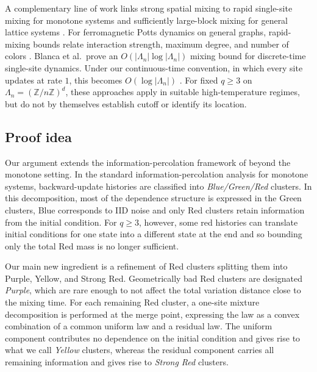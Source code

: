 \documentclass[letterpaper,11pt,reqno]{amsart}
\theoremstyle{definition}
\begin{document}
A complementary line of work links strong spatial mixing to rapid single-site mixing for monotone systems and sufficiently large-block mixing for general lattice systems \cite{RapidMixLattice}.
For ferromagnetic Potts dynamics on general graphs, rapid-mixing bounds relate interaction strength, maximum degree, and number of colors \cite{GeneralPotts}.
Blanca et al.\ prove an \(O(|\Lambda_n|\log|\Lambda_n|)\) mixing bound
for discrete-time single-site dynamics. Under our continuous-time convention, in which every site updates at rate \(1\), this becomes
\(O(\log|\Lambda_n|)\) \cite{Spectral}.
For fixed \(q\ge3\) on \(\Lambda_n=(\mathbb Z/n\mathbb Z)^d\), these approaches apply in suitable high-temperature regimes, but do not by themselves establish cutoff or identify its location.








\subsection{Proof idea}

Our argument extends the information-percolation framework of \cite{Exposition,Universality} beyond the monotone setting. In the standard information-percolation analysis for monotone systems, backward-update histories are classified into \emph{Blue/Green/Red} clusters. In this decomposition, most of the dependence structure is expressed in the Green clusters, Blue corresponds to IID noise and only Red clusters retain information from the initial condition. For \(q\ge3\), however, some red histories can translate initial conditions for one state into a different state at the end and so bounding only the total Red mass is no longer sufficient.

Our main new ingredient is a refinement of Red clusters splitting them into Purple, Yellow, and Strong Red.
Geometrically bad Red clusters are designated \emph{Purple}, which are rare enough to not affect the total variation distance close to the mixing time. For each remaining Red cluster, a one-site mixture decomposition is performed at the merge point, expressing the law as a convex combination of a common uniform law and a residual law. The uniform component contributes no dependence on the initial condition and gives rise to what we call \emph{Yellow} clusters, whereas the residual component carries all remaining information and gives rise to \emph{Strong Red} clusters.
\end{document}
